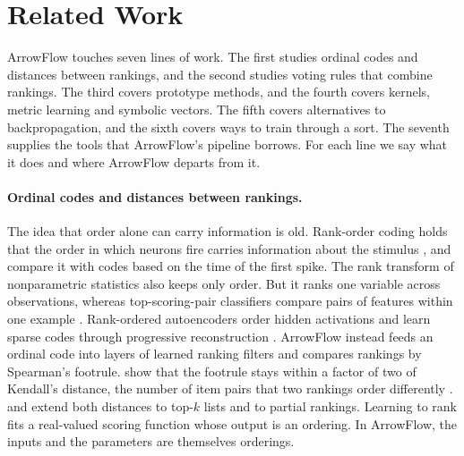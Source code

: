 \section{Related Work}\label{sec:related}

ArrowFlow touches seven lines of work. The first studies ordinal codes and distances between rankings, and the second studies voting rules that combine rankings. The third covers prototype methods, and the fourth covers kernels, metric learning and symbolic vectors. The fifth covers alternatives to backpropagation, and the sixth covers ways to train through a sort. The seventh supplies the tools that ArrowFlow's pipeline borrows. For each line we say what it does and where ArrowFlow departs from it.

\paragraph{Ordinal codes and distances between rankings.}
The idea that order alone can carry information is old. Rank-order coding holds that the order in which neurons fire carries information about the stimulus \citep{thorpe1998rapid,gautrais1998rate,thorpe2001spike}, and \citet{bonilla2022analyzing} compare it with codes based on the time of the first spike. The rank transform of nonparametric statistics \citep{conover1981rank} also keeps only order. But it ranks one variable across observations, whereas top-scoring-pair classifiers compare pairs of features within one example \citep{geman2004classifying}. Rank-ordered autoencoders order hidden activations and learn sparse codes through progressive reconstruction \citep{bertens2016rank}. ArrowFlow instead feeds an ordinal code into layers of learned ranking filters and compares rankings by Spearman's footrule. \citet{diaconis1977footrule} show that the footrule stays within a factor of two of Kendall's distance, the number of item pairs that two rankings order differently \citep{kendall1938}. \citet{fagin2003topk} and \citet{fagin2006partial} extend both distances to top-$k$ lists and to partial rankings. Learning to rank \citep{burges2005learning,burges2010ranknet} fits a real-valued scoring function whose output is an ordering. In ArrowFlow, the inputs and the parameters are themselves orderings.

